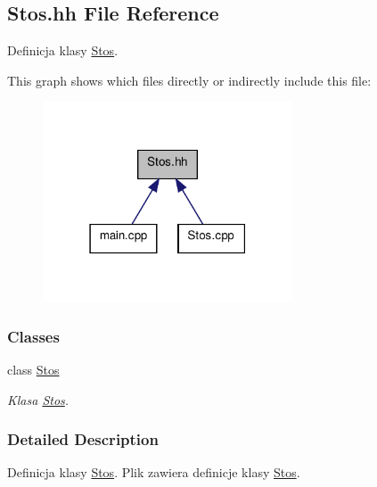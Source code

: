 \hypertarget{a00013}{\subsection{Stos.\-hh File Reference}
\label{a00013}
}


Definicja klasy \hyperlink{a00004}{Stos}.  


This graph shows which files directly or indirectly include this file\-:\nopagebreak
\begin{figure}[H]
\begin{center}
\leavevmode
\includegraphics[width=210pt]{a00024}
\end{center}
\end{figure}
\subsubsection*{Classes}
\begin{DoxyCompactItemize}
\item 
class \hyperlink{a00004}{Stos}
\begin{DoxyCompactList}\small\item\em Klasa \hyperlink{a00004}{Stos}. \end{DoxyCompactList}\end{DoxyCompactItemize}


\subsubsection{Detailed Description}
Definicja klasy \hyperlink{a00004}{Stos}. Plik zawiera definicje klasy \hyperlink{a00004}{Stos}. 